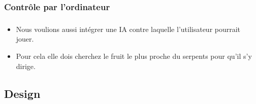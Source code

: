 \documentclass{beamer}
\begin{document}
\subsubsection{Contrôle par l'ordinateur}
\begin{frame}
\frametitle{\insertsubsubsection}
\framesubtitle{\insertsubsection}
\begin{itemize}
\item Nous voulions aussi intégrer une IA contre laquelle l'utilisateur pourrait jouer.
\item Pour cela elle dois cherchez le fruit le plus proche du serpents pour qu'il s'y dirige.
\end{itemize}


\end{frame}
\subsection{Design}
\end{document}

